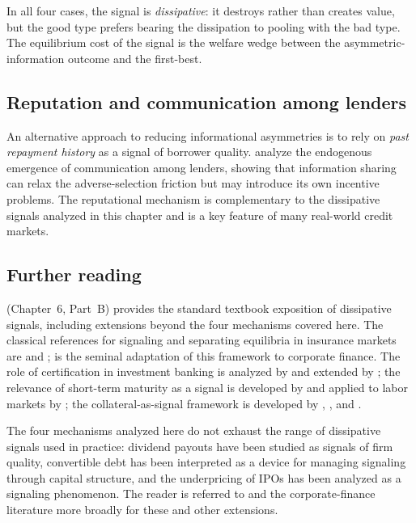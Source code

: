 \documentclass[11pt,a4paper,oneside]{book}
\theoremstyle{plain}
\theoremstyle{definition}
\theoremstyle{remark}
\numberwithin{equation}{chapter}
\begin{document}
In all four cases, the signal is \emph{dissipative}: it destroys rather than creates value, but the good type prefers bearing the dissipation to pooling with the bad type.
The equilibrium cost of the signal is the welfare wedge between the asymmetric-information outcome and the first-best.

\subsection{Reputation and communication among lenders}

An alternative approach to reducing informational asymmetries is to rely on \emph{past repayment history} as a signal of borrower quality.
\citet{PadillaPagano1997} analyze the endogenous emergence of communication among lenders, showing that information sharing can relax the adverse-selection friction but may introduce its own incentive problems.
The reputational mechanism is complementary to the dissipative signals analyzed in this chapter and is a key feature of many real-world credit markets.

\subsection{Further reading}

\citet{Tirole2006} (Chapter~6, Part~B) provides the standard textbook exposition of dissipative signals, including extensions beyond the four mechanisms covered here.
The classical references for signaling and separating equilibria in insurance markets are \citet{RothschildStiglitz1976} and \citet{Stiglitz1977}; \citet{LelandPyle1977} is the seminal adaptation of this framework to corporate finance.
The role of certification in investment banking is analyzed by \citet{Baron1982} and extended by \citet{ChemmanurFulghieri1999}; the relevance of short-term maturity as a signal is developed by \citet{Diamond1991, Diamond1993} and applied to labor markets by \citet{Hermalin2002}; the collateral-as-signal framework is developed by \citet{Bester1985, Bester1987}, \citet{BesankoThakor1987}, and \citet{ChanKanatas1985}.

The four mechanisms analyzed here do not exhaust the range of dissipative signals used in practice: dividend payouts have been studied as signals of firm quality, convertible debt has been interpreted as a device for managing signaling through capital structure, and the underpricing of IPOs has been analyzed as a signaling phenomenon.
The reader is referred to \citet{Tirole2006} and the corporate-finance literature more broadly for these and other extensions.
\end{document}
